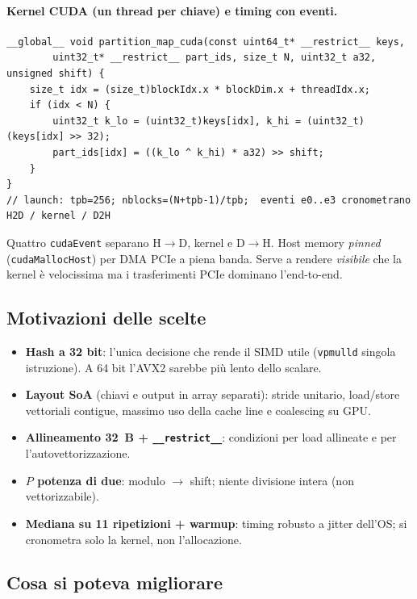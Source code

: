 \documentclass[11pt,a4paper]{article}
\begin{document}
\paragraph{Kernel CUDA (un thread per chiave) e timing con eventi.}
\begin{lstlisting}[style=cpp]
__global__ void partition_map_cuda(const uint64_t* __restrict__ keys,
        uint32_t* __restrict__ part_ids, size_t N, uint32_t a32, unsigned shift) {
    size_t idx = (size_t)blockIdx.x * blockDim.x + threadIdx.x;
    if (idx < N) {
        uint32_t k_lo = (uint32_t)keys[idx], k_hi = (uint32_t)(keys[idx] >> 32);
        part_ids[idx] = ((k_lo ^ k_hi) * a32) >> shift;
    }
}
// launch: tpb=256; nblocks=(N+tpb-1)/tpb;  eventi e0..e3 cronometrano H2D / kernel / D2H
\end{lstlisting}

\begin{whybox}
Quattro \texttt{cudaEvent} separano H$\to$D, kernel e D$\to$H. Host memory \emph{pinned} (\texttt{cudaMallocHost}) per DMA PCIe a piena banda. Serve a rendere \emph{visibile} che la kernel è velocissima ma i trasferimenti PCIe dominano l'end-to-end.
\end{whybox}

\subsection{Motivazioni delle scelte}

\begin{itemize}
  \item \textbf{Hash a 32 bit}: l'unica decisione che rende il SIMD utile (\texttt{vpmulld} singola istruzione). A 64 bit l'AVX2 sarebbe più lento dello scalare.
  \item \textbf{Layout SoA} (chiavi e output in array separati): stride unitario, load/store vettoriali contigue, massimo uso della cache line e coalescing su GPU.
  \item \textbf{Allineamento 32~B + \texttt{\_\_restrict\_\_}}: condizioni per load allineate e per l'autovettorizzazione.
  \item \textbf{$P$ potenza di due}: modulo $\to$ shift; niente divisione intera (non vettorizzabile).
  \item \textbf{Mediana su 11 ripetizioni + warmup}: timing robusto a jitter dell'OS; si cronometra solo la kernel, non l'allocazione.
\end{itemize}

\subsection{Cosa si poteva migliorare}
\end{document}
